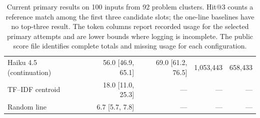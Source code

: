 \begin{table}[ht]
\begin{tabular}{lrrrr}
Haiku 4.5 (continuation) & 56.0 [46.9, 65.1] & 69.0 [61.2, 76.5] & 1,053,443 & 658,433 \\
TF--IDF centroid & 18.0 [11.0, 25.3] & --- & --- & --- \\
Random line & 6.7 [5.7, 7.8] & --- & --- & --- \\
\bottomrule
\end{tabular}
\caption{Current primary results on 100 inputs from 92 problem clusters. Hit@3 counts a reference match among the first three candidate slots; the one-line baselines have no top-three result. The token columns report recorded usage for the selected primary attempts and are lower bounds where logging is incomplete. The public score file identifies complete totals and missing usage for each configuration.}
\label{tab:ccl-primary-results}
\end{table}
